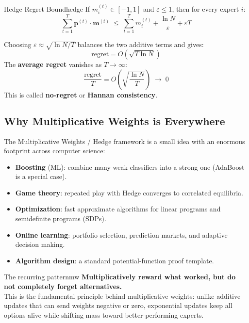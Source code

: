 \begin{theorem}{Hedge Regret Bound}{hedge}
If $m_i^{(t)} \in [-1,1]$ and $\varepsilon \leq 1$, then for every expert $i$:
\[
\sum_{t=1}^T \mathbf{p}^{(t)} \cdot \mathbf{m}^{(t)} \;\leq\; \sum_{t=1}^T m_i^{(t)} + \frac{\ln N}{\varepsilon} + \varepsilon T
\]
\end{theorem}

Choosing $\varepsilon \approx \sqrt{\ln N / T}$ balances the two additive terms and gives:
\[
\text{regret} = O\!\left(\sqrt{T \ln N}\right)
\]
The \textbf{average regret} vanishes as $T \to \infty$:
\[
\frac{\text{regret}}{T} = O\!\left(\sqrt{\frac{\ln N}{T}}\right) \;\to\; 0
\]
This is called \textbf{no-regret} or \textbf{Hannan consistency}.

\subsection{Why Multiplicative Weights is Everywhere}

The Multiplicative Weights / Hedge framework is a small idea with an enormous footprint across computer science:

\begin{itemize}
  \item \textbf{Boosting} (ML): combine many weak classifiers into a strong one (AdaBoost is a special case).
  \item \textbf{Game theory}: repeated play with Hedge converges to correlated equilibria.
  \item \textbf{Optimization}: fast approximate algorithms for linear programs and semidefinite programs (SDPs).
  \item \textbf{Online learning}: portfolio selection, prediction markets, and adaptive decision making.
  \item \textbf{Algorithm design}: a standard potential-function proof template.
\end{itemize}

\begin{remark}{The recurring pattern}{mw}
\textbf{Multiplicatively reward what worked, but do not completely forget alternatives.}\\[0.3em]
This is the fundamental principle behind multiplicative weights: unlike additive updates that can send weights negative or zero, exponential updates keep all options alive while shifting mass toward better-performing experts.
\end{remark}

